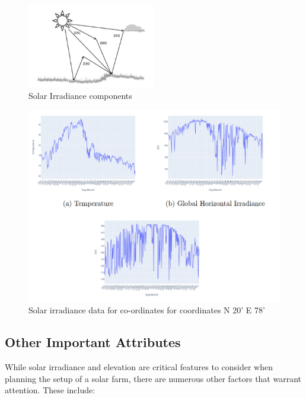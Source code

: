 \documentclass[a4paper,12pt]{Classes/RoboticsLaTeX}
\begin{document}
	\begin{figure}[H]
		\centering
		\includegraphics[width=0.5\textwidth]{Figures/Solar Irradiance.png} %
		\caption{Solar Irradiance components\cite{vignola2023}}
		\label{fig:my_label3} %
	\end{figure}


	\begin{figure}[H]
		\centering
		\includegraphics[width=1\textwidth]{Figures/Solar Graphs.png} %
		\caption{Solar irradiance data for co-ordinates for coordinates N 20' E 78'}
		\label{fig:my_label4} %
	\end{figure}

	\subsection{Other Important Attributes}

	While solar irradiance and elevation are critical features to consider when planning the setup of a solar farm, there are numerous other factors that warrant attention. 
	These include:
\end{document}
